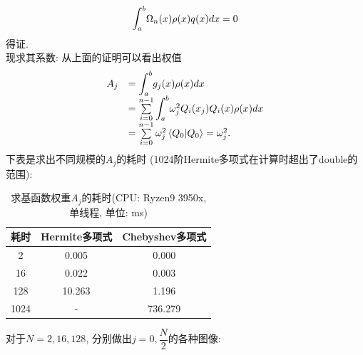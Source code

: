 \documentclass[UTF8]{ctexart}
\newcommand{\lint}{\mathlarger{\int}}
\begin{document}
            \begin{equation}
                \lint_a^b\Omega_n(x)\rho(x)q(x)dx=0
            \end{equation}
            得证.\\
            \indent 现求其系数: 从上面的证明可以看出权值
            \begin{equation}
                \begin{array}{ll}
                    A_j&=\lint_a^bg_j(x)\rho(x)dx\\
                    &=\sum\limits_{i=0}^{n-1}\lint_a^b\omega_j^2Q_i(x_j)Q_i(x)\rho(x)dx\\
                    &=\sum\limits_{i=0}^{n-1}\omega_j^2\left<Q_0|Q_0\right>=\omega_j^2.
                \end{array}
            \end{equation}
            下表是求出不同规模的$A_j$的耗时 (1024阶Hermite多项式在计算时超出了double的范围):
            \begin{table}[H]
                \centering
                \caption{求基函数权重$A_j$的耗时(CPU: Ryzen9 3950x, 单线程, 单位: ms)}
                \begin{tabular}{|c|c|c|}
                    \hline
                    耗时&Hermite多项式&Chebyshev多项式\\
                    \hline
                    2&0.005&0.000\\
                    \hline
                    16&0.022&0.003\\
                    \hline
                    128&10.263&1.196\\
                    \hline
                    1024&-&736.279\\
                    \hline
                \end{tabular}
            \end{table}
            \indent 对于$N=2, 16, 128$, 分别做出$j=0,\dfrac{N}{2}$的各种图像:
\end{document}
